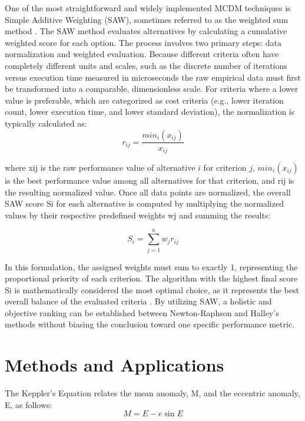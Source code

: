 \documentclass[a4paper,11pt]{article}
\begin{document}
One of the most straightforward and widely implemented MCDM techniques is Simple Additive Weighting (SAW), sometimes referred to as the weighted sum method \parencite{tzeng2011multiple}. The SAW method evaluates alternatives by calculating a cumulative weighted score for each option. The process involves two primary steps: data normalization and weighted evaluation. Because different criteria often have completely different units and scales, such as the discrete number of iterations versus execution time measured in microseconds the raw empirical data must first be transformed into a comparable, dimensionless scale. For criteria where a lower value is preferable, which are categorized as cost criteria (e.g., lower iteration count, lower execution time, and lower standard deviation), the normalization is typically calculated as:
\begin{equation*}
    r_{ij} = \dfrac{min_i(x_{ij})}{x_{ij}}
\end{equation*}

where xij is the raw performance value of alternative $i$ for criterion $j$, $min_i(x_{ij})$ is the best performance value among all alternatives for that criterion, and rij is the resulting normalized value. Once all data points are normalized, the overall SAW score Si for each alternative is computed by multiplying the normalized values by their respective predefined weights wj and summing the results:

\begin{equation*}
    S_i = \sum_{j=1}^{n} w_j r_{ij}
\end{equation*}

In this formulation, the assigned weights must sum to exactly 1, representing the proportional priority of each criterion. The algorithm with the highest final score Si is mathematically considered the most optimal choice, as it represents the best overall balance of the evaluated criteria \parencite{tzeng2011multiple}. By utilizing SAW, a holistic and objective ranking can be established between Newton-Raphson and Halley's methods without biasing the conclusion toward one specific performance metric.


\section{Methods and Applications}

The Keppler's Equation relates the mean anomaly, M, and the eccentric anomaly, E, as follows:
\begin{equation*}
M = E - e \sin E
\end{equation*}
\end{document}
